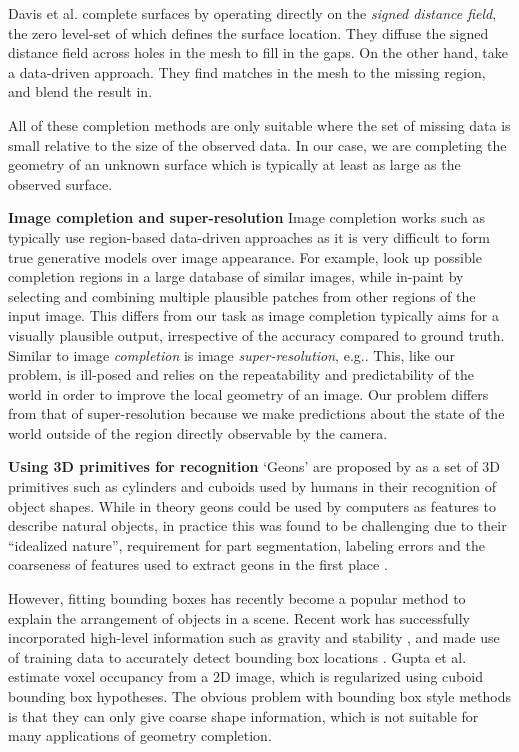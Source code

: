 \documentclass[10pt,twocolumn,letterpaper]{article}
\makeatletter
\renewcommand*{\eg}{e.g.\@\xspace}
\newcommand*{\ea}{et al.\@\xspace}
\makeatother
\begin{document}
Davis \ea \cite{davis-3dpvt-2002} complete surfaces by operating directly on the \emph{signed distance field}, the zero level-set of which defines the surface location. They diffuse the signed distance field across holes in the mesh to fill in the gaps.
On the other hand, \cite{harary-tog-2013} take a data-driven approach.
They find matches in the mesh to the missing region, and blend the result in.

All of these completion methods are only suitable where the set of missing data is small relative to the size of the observed data.
In our case, we are completing the geometry of an unknown surface which is typically at least as large as the observed surface.


\noindent\textbf{Image completion and super-resolution}
Image completion works such as \cite{hays-siggraph-2007, criminisi-cvpr-2003}
typically use region-based data-driven approaches as it is very difficult to form true generative models over image appearance.
For example, \cite{hays-siggraph-2007} look up possible completion regions in a large database of similar images, while \cite{criminisi-cvpr-2003} in-paint by selecting and combining multiple plausible patches from other regions of the input image.
This differs from our task as image completion typically aims for a visually plausible output, irrespective of the accuracy compared to ground truth.
Similar to image \emph{completion} is image \emph{super-resolution}, \eg \cite{macaodha-eccv-2012}. 
This, like our problem, is ill-posed and relies on the repeatability and predictability of the world in order to improve the local geometry of an image.
Our problem differs from that of super-resolution because we make predictions about the state of the world outside of the region directly observable by the camera.


\noindent\textbf{Using 3D primitives for recognition}
`Geons' are proposed by \cite{bieberman-rbc-1987} as a set of 3D primitives such as cylinders and cuboids used by humans in their recognition of object shapes.
While in theory geons could be used by computers  as features to describe natural objects, in practice this was found to be challenging due to their ``idealized nature'', requirement for part segmentation, labeling errors and the coarseness of features used to extract geons in the first place \cite{dickinson-iavc-1997}.

However, fitting bounding boxes has recently become a popular method to explain the arrangement of objects in a scene.
Recent work has successfully incorporated high-level information such as gravity and stability
 \cite{shao-siggraphasia-2014, jia-cvpr-2013}, and made use of training data to accurately detect bounding box locations \cite{hedau-cvpr-2012}.
Gupta \ea \cite{gupta-cvpr-2011} estimate voxel occupancy from a 2D image, which is regularized using cuboid bounding box hypotheses.
The obvious problem with bounding box style methods is that they can only give coarse shape information, which is not suitable for many applications of geometry completion.
\end{document}
